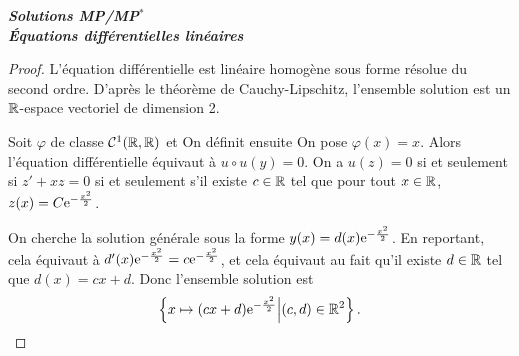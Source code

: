 \documentclass[12pt]{article}
\begin{document}
\begin{titlepage}
	\centering
	\vspace*{\fill}
	\Huge \textit{\textbf{Solutions MP/MP$^*$\\ Équations différentielles linéaires}}
	\vspace*{\fill}
\end{titlepage}

\begin{proof}

	L'équation différentielle est linéaire homogène sous forme résolue du second ordre. D'après le théorème de Cauchy-Lipschitz, l'ensemble solution est un $\mathbb{R}$-espace vectoriel de dimension 2.

	Soit $\varphi$ de classe $\mathcal{C}^{1}(\mathbb{R},\mathbb{R})$ et 
	On définit ensuite 
	On pose $\varphi(x)=x$. Alors l'équation différentielle équivaut à $u\circ u(y)=0$. On a $u(z)=0$ si et seulement si $z'+xz=0$ si et seulement s'il existe $c\in\mathbb{R}$ tel que pour tout $x\in\mathbb{R}$, $z(x)=C\mathrm{e}^{-\frac{x^{2}}{2}}$.

	On cherche la solution générale sous la forme $y(x)=d(x)\mathrm{e}^{-\frac{x^{2}}{2}}$. En reportant, cela équivaut à $d'(x)\mathrm{e}^{-\frac{x^{2}}{2}}=c\mathrm{e}^{-\frac{x^{2}}{2}}$, et cela équivaut au fait qu'il existe $d\in\mathbb{R}$ tel que $d(x)=cx+d$.
	Donc l'ensemble solution est 
	\begin{equation}
		\left\lbrace x\mapsto(cx+d)\mathrm{e}^{-\frac{x^{2}}{2}}\middle| (c,d)\in\mathbb{R}^{2}\right\rbrace.
	\end{equation}
\end{proof}
\end{document}
